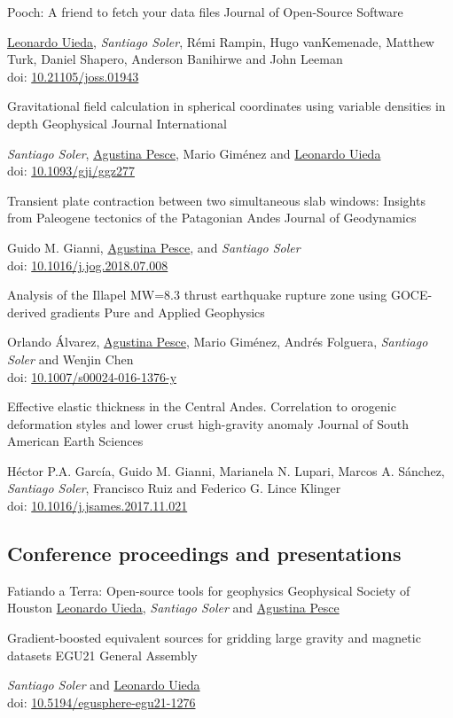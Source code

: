 \documentclass[a4paper,12pt,sans,colorlinks]{moderncv/moderncv}
\newcommand{\me}{\emph{Santiago Soler}}
\newcommand{\agustina}{\href{https://aguspesce.github.io}{Agustina Pesce}}
\newcommand{\guido}{Guido M. Gianni}
\newcommand{\leo}{\href{https://www.leouieda.com}{Leonardo Uieda}}
\newcommand{\mario}{Mario Giménez}
\newcommand{\remirampin}{Rémi Rampin}
\newcommand{\hugovankemenade}{Hugo vanKemenade}
\newcommand{\matthewturk}{Matthew Turk}
\newcommand{\danshapero}{Daniel Shapero}
\newcommand{\andersonbanihirwe}{Anderson Banihirwe}
\newcommand{\johnleeman}{John Leeman}
\newcommand{\orlando}{Orlando Álvarez}
\newcommand{\folguera}{Andrés Folguera}
\newcommand{\wenjinchen}{Wenjin Chen}
\newcommand{\pichu}{Héctor P.A. García}
\newcommand{\mae}{Marianela N. Lupari}
\newcommand{\marcos}{Marcos A. Sánchez}
\newcommand{\paco}{Francisco Ruiz}
\newcommand{\fede}{Federico G. Lince Klinger}
\newcommand{\doi}[1]{
    \href{https://doi.org/#1}{#1}
}
\begin{document}
{Pooch: A friend to fetch your data files}
{Journal of Open-Source Software}
{}
{}
{
    \leo{}, \me{}, \remirampin{}, \hugovankemenade{}, \matthewturk{},
    \danshapero{}, \andersonbanihirwe{} and \johnleeman{}
    \\
    doi: \doi{10.21105/joss.01943}
}

{
    Gravitational field calculation in spherical coordinates using variable
    densities in depth
}
{Geophysical Journal International}
{}
{}
{
    \me{}, \agustina{}, \mario{} and \leo{}
    \\
    doi: \doi{10.1093/gji/ggz277}
}

{
    Transient plate contraction between two simultaneous slab windows:
    Insights from Paleogene tectonics of the Patagonian Andes
}
{Journal of Geodynamics}
{}
{}
{
    \guido{}, \agustina{}, and \me{}
    \\
    doi: \doi{10.1016/j.jog.2018.07.008}
}

{
    Analysis of the Illapel MW=8.3 thrust earthquake rupture zone using
    GOCE-derived gradients
}
{Pure and Applied Geophysics}
{}
{}
{
    \orlando{}, \agustina{}, \mario{}, \folguera{}, \me{} and \wenjinchen{}
    \\
    doi: \doi{10.1007/s00024-016-1376-y}
}

{
    Effective elastic thickness in the Central Andes.
    Correlation to orogenic deformation styles and lower crust high-gravity
    anomaly
}
{Journal of South American Earth Sciences}
{}
{}
{
    \pichu{}, \guido{}, \mae{}, \marcos{}, \me{}, \paco{} and \fede{}
    \\
    doi: \doi{10.1016/j.jsames.2017.11.021}
}


\newpage
\subsection{Conference proceedings and presentations}

{Fatiando a Terra: Open-source tools for geophysics}
{Geophysical Society of Houston}
{}
{}
{\leo{}, \me{} and \agustina{}}

{
    Gradient-boosted equivalent sources for gridding large gravity and
    magnetic datasets
}
{EGU21 General Assembly}
{}
{}
{
    \me{} and \leo{}
    \\
    doi: \doi{10.5194/egusphere-egu21-1276}
}
\end{document}
